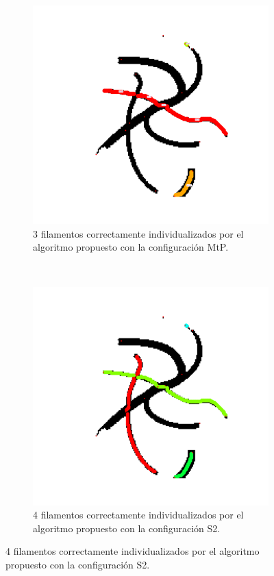 \begin{figure}[h!]
    \begin{subfigure}[t]{0.49\textwidth}
        \centering
        \includegraphics[scale=0.11]{resultImages/define-weighted-4-phil-s0-v05-exactMatch-antLabeled.png}
        \caption{3 filamentos correctamente individualizados por el algoritmo propuesto con la configuraci\'on MtP.}
        \label{fig:SynthDefine-Individualizacion-BestP1}
    \end{subfigure}
    ~
    \begin{subfigure}[t]{0.49\textwidth}
        \centering
        \includegraphics[scale=0.11]{resultImages/define-weighted-4-phil-s3389-v056-exactMatch-antLabeled.png}
        \caption{4 filamentos correctamente individualizados por el algoritmo propuesto con la configuraci\'on S2.}
        \label{fig:SynthDefine-Individualizacion-BestP2}
    \end{subfigure}
    

\end{figure}
